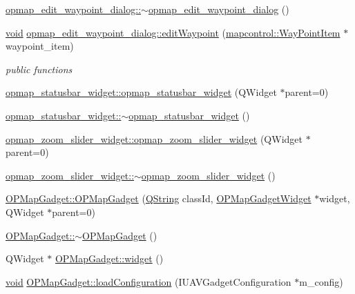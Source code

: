 \begin{DoxyCompactItemize}
\item 
\hyperlink{group___o_p_map_plugin_ga7d3684f9a7139a132614c5f4d9d91910}{opmap\-\_\-edit\-\_\-waypoint\-\_\-dialog\-::$\sim$opmap\-\_\-edit\-\_\-waypoint\-\_\-dialog} ()
\item 
\hyperlink{group___u_a_v_objects_plugin_ga444cf2ff3f0ecbe028adce838d373f5c}{void} \hyperlink{group___o_p_map_plugin_gaf5d4c9a4e4bc3c4b358df3168b2e6b03}{opmap\-\_\-edit\-\_\-waypoint\-\_\-dialog\-::edit\-Waypoint} (\hyperlink{classmapcontrol_1_1_way_point_item}{mapcontrol\-::\-Way\-Point\-Item} $\ast$waypoint\-\_\-item)
\begin{DoxyCompactList}\small\item\em public functions \end{DoxyCompactList}\item 
\hyperlink{group___o_p_map_plugin_gacb2a078a376c25f8ca59214a7a231122}{opmap\-\_\-statusbar\-\_\-widget\-::opmap\-\_\-statusbar\-\_\-widget} (Q\-Widget $\ast$parent=0)
\item 
\hyperlink{group___o_p_map_plugin_gaf9e51f27e900dce668581330be2f272f}{opmap\-\_\-statusbar\-\_\-widget\-::$\sim$opmap\-\_\-statusbar\-\_\-widget} ()
\item 
\hyperlink{group___o_p_map_plugin_ga95e119b3d479e4740f8231bef84b59ac}{opmap\-\_\-zoom\-\_\-slider\-\_\-widget\-::opmap\-\_\-zoom\-\_\-slider\-\_\-widget} (Q\-Widget $\ast$parent=0)
\item 
\hyperlink{group___o_p_map_plugin_gab379eba250616b76de62dd392fa0e14d}{opmap\-\_\-zoom\-\_\-slider\-\_\-widget\-::$\sim$opmap\-\_\-zoom\-\_\-slider\-\_\-widget} ()
\item 
\hyperlink{group___o_p_map_plugin_ga6782261a51cde76c6b7fd104e0fc8607}{O\-P\-Map\-Gadget\-::\-O\-P\-Map\-Gadget} (\hyperlink{group___u_a_v_objects_plugin_gab9d252f49c333c94a72f97ce3105a32d}{Q\-String} class\-Id, \hyperlink{class_o_p_map_gadget_widget}{O\-P\-Map\-Gadget\-Widget} $\ast$widget, Q\-Widget $\ast$parent=0)
\item 
\hyperlink{group___o_p_map_plugin_ga041e6faec573a7770cc9ddfdf8694a5e}{O\-P\-Map\-Gadget\-::$\sim$\-O\-P\-Map\-Gadget} ()
\item 
Q\-Widget $\ast$ \hyperlink{group___o_p_map_plugin_ga4c0dd792243fff2dc45fd98929145d27}{O\-P\-Map\-Gadget\-::widget} ()
\item 
\hyperlink{group___u_a_v_objects_plugin_ga444cf2ff3f0ecbe028adce838d373f5c}{void} \hyperlink{group___o_p_map_plugin_ga8a10d4d6d7feb8ab2c2dd928cc46c260}{O\-P\-Map\-Gadget\-::load\-Configuration} (I\-U\-A\-V\-Gadget\-Configuration $\ast$m\-\_\-config)

\end{DoxyCompactItemize}
